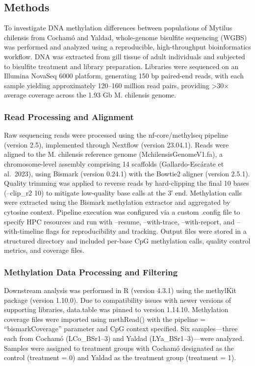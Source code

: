 \documentclass[
]{agujournal2019}
\begin{document}
\subsection{Methods}\label{methods}

To investigate DNA methylation differences between populations of
Mytilus chilensis from Cochamó and Yaldad, whole-genome bisulfite
sequencing (WGBS) was performed and analyzed using a reproducible,
high-throughput bioinformatics workflow. DNA was extracted from gill
tissue of adult individuals and subjected to bisulfite treatment and
library preparation. Libraries were sequenced on an Illumina NovaSeq
6000 platform, generating 150 bp paired-end reads, with each sample
yielding approximately 120--160 million read pairs, providing
\textgreater30× average coverage across the 1.93 Gb M. chilensis genome.

\subsubsection{Read Processing and
Alignment}\label{read-processing-and-alignment}

Raw sequencing reads were processed using the nf-core/methylseq pipeline
(version 2.5), implemented through Nextflow (version 23.04.1). Reads
were aligned to the M. chilensis reference genome
(MchilensisGenomeV1.fa), a chromosome-level assembly comprising 14
scaffolds (Gallardo-Escárate et al.~2023), using Bismark (version
0.24.1) with the Bowtie2 aligner (version 2.5.1). Quality trimming was
applied to reverse reads by hard-clipping the final 10 bases (--clip\_r2
10) to mitigate low-quality base calls at the 3′ end. Methylation calls
were extracted using the Bismark methylation extractor and aggregated by
cytosine context. Pipeline execution was configured via a custom .config
file to specify HPC resources and run with --resume, --with-trace,
--with-report, and --with-timeline flags for reproducibility and
tracking. Output files were stored in a structured directory and
included per-base CpG methylation calls, quality control metrics, and
coverage files.

\subsubsection{Methylation Data Processing and
Filtering}\label{methylation-data-processing-and-filtering}

Downstream analysis was performed in R (version 4.3.1) using the
methylKit package (version 1.10.0). Due to compatibility issues with
newer versions of supporting libraries, data.table was pinned to version
1.14.10. Methylation coverage files were imported using methRead() with
the pipeline = ``bismarkCoverage'' parameter and CpG context specified.
Six samples---three each from Cochamó (LCo\_BSr1--3) and Yaldad
(LYa\_BSr1--3)---were analyzed. Samples were assigned to treatment
groups with Cochamó designated as the control (treatment = 0) and Yaldad
as the treatment group (treatment = 1).
\end{document}
